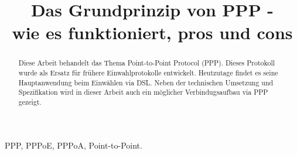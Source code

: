 \documentclass[journal]{IEEEtran}
\begin{document}
 
\title{Das Grundprinzip von PPP - \\wie es funktioniert, pros und cons} 
\author{
 }
\maketitle 
\begin{abstract} 
Diese Arbeit behandelt das Thema Point-to-Point Protocol (PPP). Dieses Protokoll wurde als Ersatz f\"ur fr\"uhere Einwahlprotokolle entwickelt. Heutzutage findet es seine Hauptanwendung beim Einw\"ahlen via DSL. Neben der technischen Umsetzung und Spezifikation wird in dieser Arbeit auch ein m\"oglicher Verbindugsaufbau via PPP gezeigt.
\end{abstract} 
\begin{IEEEkeywords} 
PPP, PPPoE, PPPoA, Point-to-Point. 
\end{IEEEkeywords}
\end{document}
